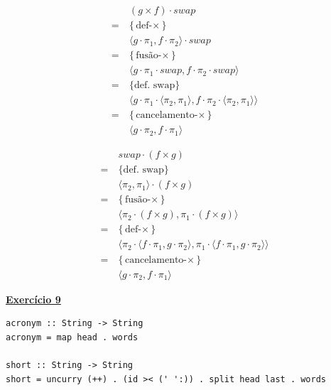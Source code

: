 \documentclass[a4paper,11pt]{article}
\begin{document}
	\begin{minipage}{0.47\textwidth}
		\begin{mdframed}
			\[
			\begin{aligned}
				&(g \times f) \cdot swap \\
				= \  &\{\text{def-$\times$}\}\\
				&\langle g \cdot \pi_1, f \cdot \pi_2 \rangle \cdot swap \\
				= \  &\{\text{fusão-$\times$}\}\\
				&\langle g \cdot \pi_1 \cdot swap, f \cdot \pi_2 \cdot swap \rangle \\
				= \  &\{\text{def. swap}\}\\
				&\langle g \cdot \pi_1 \cdot \langle \pi_2, \pi_1 \rangle, f \cdot \pi_2 \cdot \langle \pi_2, \pi_1 \rangle \rangle \\
				= \  &\{\text{cancelamento-$\times$}\}\\
				&\langle g \cdot \pi_2 , f \cdot \pi_1 \rangle
			\end{aligned}
			\]
		\end{mdframed}
	\end{minipage}
	\hfill
	\begin{minipage}{0.47\textwidth}
		\begin{mdframed}
			\[
			\begin{aligned}
				&swap \cdot (f \times g) \\
				= \  &\{\text{def. swap}\}\\
				&\langle \pi_2, \pi_1 \rangle \cdot (f \times g)\\
				= \  &\{\text{fusão-$\times$}\}\\
				&\langle \pi_2 \cdot (f \times g), \pi_1 \cdot (f \times g) \rangle \\
				= \  &\{\text{def-$\times$}\}\\
				&\langle \pi_2 \cdot  \langle f \cdot \pi_1, g \cdot \pi_2 \rangle, \pi_1 \cdot  \langle f \cdot \pi_1, g \cdot \pi_2 \rangle \rangle \\
				= \  &\{\text{cancelamento-$\times$}\}\\
				&\langle g \cdot \pi_2 , f \cdot \pi_1 \rangle
			\end{aligned}
			\]
		\end{mdframed}
	\end{minipage}
	
	
	\newpage

	\noindent \underline{\textbf{Exercício 9}}
	
\begin{verbatim}
acronym :: String -> String
acronym = map head . words

short :: String -> String
short = uncurry (++) . (id >< (' ':)) . split head last . words
\end{verbatim}
\end{document}
